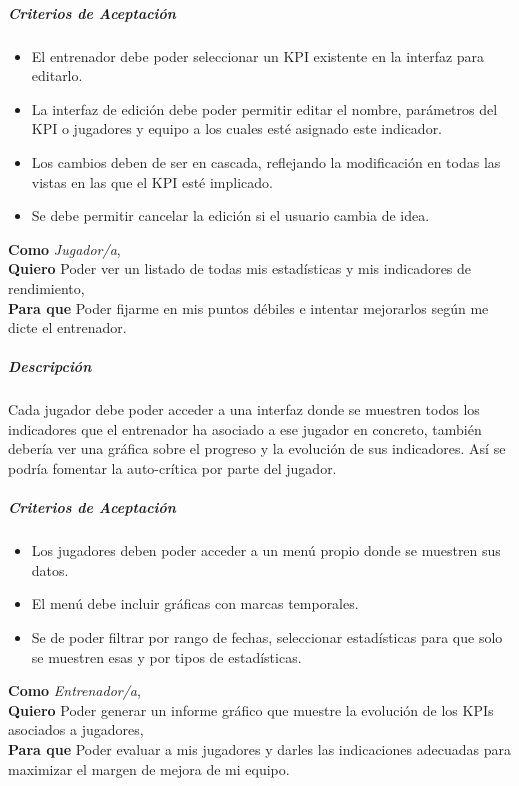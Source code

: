 \subparagraph{Criterios de Aceptación}
\begin{itemize}
    \item El entrenador debe poder seleccionar un KPI existente en la interfaz para editarlo.
    \item La interfaz de edición debe poder permitir editar el nombre, parámetros del KPI o jugadores y equipo a los cuales esté asignado este indicador.
    \item Los cambios deben de ser en cascada, reflejando la modificación en todas las vistas en las que el KPI esté implicado.
    \item Se debe permitir cancelar la edición si el usuario cambia de idea.
\end{itemize}

\begin{tcolorbox}[title=Historia de Usuario 4: Ver estadísticas]
\textbf{Como} \textit{Jugador/a},\\
\textbf{Quiero} Poder ver un listado de todas mis estadísticas y mis indicadores de rendimiento,\\
\textbf{Para que} Poder fijarme en mis puntos débiles e intentar mejorarlos según me dicte el entrenador.
\end{tcolorbox}

\subparagraph{Descripción}
Cada jugador debe poder acceder a una interfaz donde se muestren todos los indicadores que el entrenador ha asociado a ese jugador en concreto, también debería ver una gráfica sobre el progreso y la evolución de sus indicadores. Así se podría fomentar la auto-crítica por parte del jugador.

\subparagraph{Criterios de Aceptación}
\begin{itemize}
    \item Los jugadores deben poder acceder a un menú propio donde se muestren sus datos.
    \item El menú debe incluir gráficas con marcas temporales.
    \item Se de poder filtrar por rango de fechas, seleccionar estadísticas para que solo se muestren esas y por tipos de estadísticas.
\end{itemize}

\begin{tcolorbox}[title=Historia de Usuario 5: Ver progreso de los jugadores]
\textbf{Como} \textit{Entrenador/a},\\
\textbf{Quiero} Poder generar un informe gráfico que muestre la evolución de los KPIs asociados a jugadores,\\
\textbf{Para que} Poder evaluar a mis jugadores y darles las indicaciones adecuadas para maximizar el margen de mejora de mi equipo.
\end{tcolorbox}

